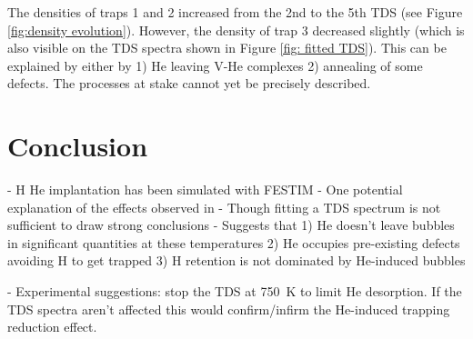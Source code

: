 The densities of traps 1 and 2 increased from the 2nd to the 5th TDS (see Figure \ref{fig:density evolution}).
However, the density of trap 3 decreased slightly (which is also visible on the TDS spectra shown in Figure \ref{fig: fitted TDS}).
This can be explained by either by 1) He leaving V-He complexes 2) annealing of some defects.
The processes at stake cannot yet be precisely described. 

\section*{Conclusion}

- H He implantation has been simulated with FESTIM
- One potential explanation of the effects observed in \cite{ialovega_hydrogen_2020}
- Though fitting a TDS spectrum is not sufficient to draw strong conclusions
- Suggests that 1) He doesn't leave bubbles in significant quantities at these temperatures 2) He occupies pre-existing defects avoiding H to get trapped 3) H retention is not dominated by He-induced bubbles

- Experimental suggestions: stop the TDS at \SI{750}{K} to limit He desorption. If the TDS spectra aren't affected this would confirm/infirm the He-induced trapping reduction effect.